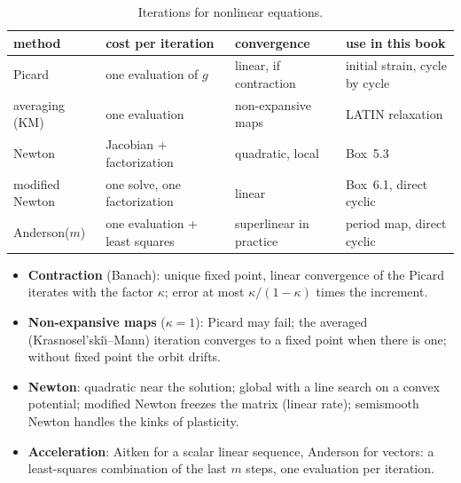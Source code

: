 \begin{table}[h]
\centering\small
\renewcommand{\arraystretch}{1.15}
\begin{tabular}{@{}llll@{}}
\toprule
\sffamily method & \sffamily cost per iteration & \sffamily convergence & \sffamily use in this book\\
\midrule
Picard & one evaluation of $g$ & linear, if contraction & initial strain, cycle by cycle\\
averaging (KM) & one evaluation & non-expansive maps & LATIN relaxation\\
Newton & Jacobian + factorization & quadratic, local & Box~5.3\\
modified Newton & one solve, one factorization & linear & Box~6.1, direct cyclic\\
Anderson($m$) & one evaluation + least squares & superlinear in practice & period map, direct cyclic\\
\bottomrule
\end{tabular}
\caption{Iterations for nonlinear equations.}
\label{tab:it-methods}
\end{table}

\begin{gbox*}
\begin{itemize}
  \item \textbf{Contraction} (Banach): unique fixed point, linear convergence
  of the Picard iterates with the factor $\kappa$; error at most
  $\kappa/(1-\kappa)$ times the increment.
  \item \textbf{Non-expansive maps} ($\kappa=1$): Picard may fail; the averaged
  (Krasnosel'ski\u{\i}--Mann) iteration converges to a fixed point when there
  is one; without fixed point the orbit drifts.
  \item \textbf{Newton}: quadratic near the solution; global with a line search
  on a convex potential; modified Newton freezes the matrix (linear rate);
  semismooth Newton handles the kinks of plasticity.
  \item \textbf{Acceleration}: Aitken for a scalar linear sequence, Anderson
  for vectors: a least-squares combination of the last $m$ steps, one
  evaluation per iteration.
\end{itemize}
\end{gbox*}


